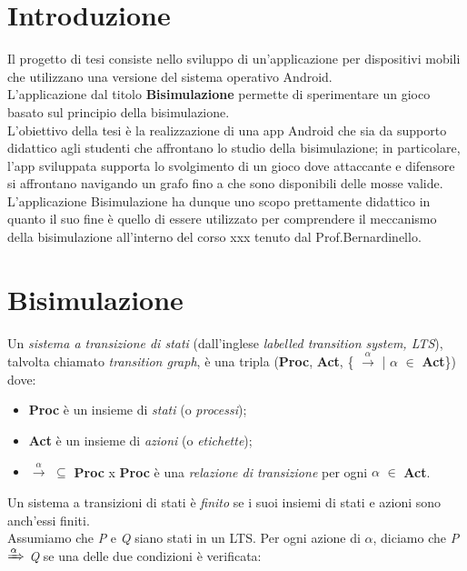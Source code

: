 \documentclass[a4paper,12pt,twoside,openright]{report}
\begin{document}
\tableofcontents

\chapter*{Introduzione}
Il progetto di tesi consiste nello sviluppo di un'applicazione per dispositivi mobili che utilizzano una versione del sistema operativo Android.\\
L'applicazione dal titolo \textbf{Bisimulazione} permette di sperimentare un gioco basato sul principio della bisimulazione.\\
L'obiettivo della tesi è la realizzazione di una app Android che sia da supporto didattico agli studenti che affrontano lo studio della bisimulazione; in particolare, l'app sviluppata supporta lo svolgimento di un gioco dove attaccante e difensore si affrontano navigando un grafo fino a che sono disponibili delle mosse valide.\\
L'applicazione Bisimulazione ha dunque uno scopo prettamente didattico in quanto il suo fine è quello di essere utilizzato per comprendere il meccanismo della bisimulazione all'interno del corso xxx tenuto dal Prof.Bernardinello.

\chapter{Bisimulazione}
Un \textit{sistema a transizione di stati} (dall'inglese \textit{labelled transition system, LTS}), talvolta chiamato \textit{transition graph}, è una tripla (\textbf{Proc}, \textbf{Act}, \{ $\xrightarrow{\alpha}$ | $\alpha$ $\in$ \textbf{Act}\}) dove:

\begin{itemize}
\item \textbf{Proc} è un insieme di \textit{stati} (o \textit{processi});

\item \textbf{Act} è un insieme di \textit{azioni} (o \textit{etichette});

\item $\xrightarrow{\alpha}$ $\subseteq$ \textbf{Proc} x \textbf{Proc} è una \textit{relazione di transizione} per ogni $\alpha$ $\in$ \textbf{Act}.
\end{itemize}

Un sistema a transizioni di stati è \textit{finito} se i suoi insiemi di stati e azioni sono anch'essi finiti.\\
Assumiamo che \textit{P} e \textit{Q} siano stati in un LTS. Per ogni azione di $\alpha$, diciamo che \textit{P} $\xRightarrow{\alpha}$ \textit{Q} se una delle due condizioni è verificata:
\end{document}
